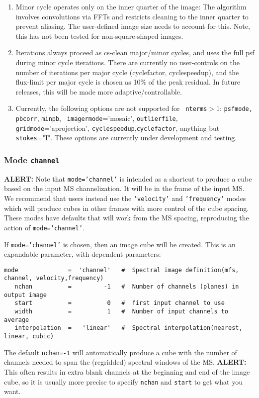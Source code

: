 \begin{enumerate}

\item Minor cycle operates only on the inner quarter of the image: The
  algorithm involves convolutions via FFTs and restricts cleaning to
  the inner quarter to prevent aliasing.  The user-defined image size
  needs to account for this.  Note, this has not been tested for
  non-square-shaped images.

\item Iterations always proceed as cs-clean major/minor cycles, and
  uses the full psf during minor cycle iterations. There are currently
  no user-controls on the number of iterations per major cycle
  (cyclefactor, cyclespeedup), and the flux-limit per major cycle is
  chosen as 10\% of the peak residual. In future releases, this will
  be made more adaptive/controllable.

\item Currently, the following options are not supported for {\tt
    nterms}$>1$: {\tt psfmode,} {\tt pbcorr}, {\tt minpb}, {\tt
    imagermode}='mosaic', {\tt outlierfile}, {\tt
    gridmode}='aprojection', {\tt cyclespeedup},{\tt cyclefactor},
  anything but {\tt stokes}="I". These options are currently under
  development and testing.

\end{enumerate}


\subsubsection{Mode {\tt channel} }
\label{section:im.pars.mode.channel}

{\bf ALERT:} Note that {\tt mode='channel'} is intended as a shortcut
to produce a cube based on the input MS channelization.  It will be in
the frame of the input MS.  We recommend that users instead use the
{\tt 'velocity'} and {\tt 'frequency'} modes which will produce cubes
in other frames with more control of the cube spacing.  These modes
have defaults that will work from the MS spacing, reproducing the
action of {\tt mode='channel'}.

If {\tt mode='channel'} is chosen, then an image cube will be
created. This is an expandable parameter, with dependent parameters:
\small
\begin{verbatim}
mode              =  'channel'   #  Spectral image definition(mfs, channel, velocity,frequency)
   nchan          =         -1   #  Number of channels (planes) in output image
   start          =          0   #  first input channel to use
   width          =          1   #  Number of input channels to average
   interpolation  =   'linear'   #  Spectral interpolation(nearest, linear, cubic)
\end{verbatim}
\normalsize
The default {\tt nchan=-1} will automatically produce a cube with the
number of channels needed to span the (regridded) spectral windows of
the MS.  {\bf ALERT:} This often results in extra blank channels at the
beginning and end of the image cube, so it is usually more precise to
specify {\tt nchan} and {\tt start} to get what you want.  

